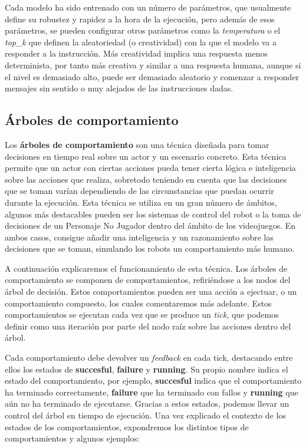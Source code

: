 \documentclass[../main.tex]{subfiles}
\begin{document}
Cada modelo ha sido entrenado con un número de parámetros, que usualmente define su robustez y rapidez a la hora de la ejecución, pero además de esos parámetros, se pueden configurar
otros parámetros como la \textit{temperatura} o el \textit{top\_k} que definen la aleatoriedad (o creatividad) con la que el modelo va a responder a la instrucción. Más creatividad implica
una respuesta menos determinista, por tanto más creativa y similar a una respuesta humana, aunque si el nivel es demasiado alto, puede ser demasiado aleatorio y comenzar a responder mensajes
sin sentido o muy alejados de las instrucciones dadas.

\subsection{Árboles de comportamiento}
Los \textbf{árboles de comportamiento} son una técnica diseñada para tomar decisiones en tiempo real sobre un actor y un escenario concreto. Esta técnica permite que un actor con ciertas
acciones pueda tener cierta lógica e inteligencia sobre las acciones que realiza, sobretodo teniendo en cuenta que las decisiones que se toman varían dependiendo de las circunstancias que puedan
ocurrir durante la ejecución. Esta técnica se utiliza en un gran número de ámbitos, algunos más destacables pueden ser los sistemas de control del robot\cite{ogren2022behavior} o la toma de decisiones de un
Personaje No Jugador dentro del ámbito de los videojuegos. En ambos casos, consigue añadir una inteligencia y un razonamiento sobre las decisiones que se toman, simulando los robots un comportamiento más humano.

A continuación explicaremos el funcionamiento de esta técnica. Los árboles de comportamiento se componen de comportamientos, refiriéndose a los nodos del árbol de decisión. Estos comportamientos pueden ser una acción a ejectuar, o un comportamiento compuesto, los cuales
comentaremos más adelante. Estos comportamientos se ejecutan cada vez que se produce un \textit{tick}, que podemos definir como una iteración por parte del nodo raíz sobre las acciones dentro del árbol. 

Cada comportamiento debe devolver
un \textit{feedback} en cada tick, destacando entre ellos los estados de \textbf{succesful}, \textbf{failure} y \textbf{running}. Su propio nombre indica el estado del comportamiento, por ejemplo, \textbf{succesful} indica que el comportamiento ha terminado correctamente,
\textbf{failure} que ha terminado con fallos y \textbf{running} que aún no ha terminado de ejecutarse. Gracias a estos estados, podemos llevar un control del árbol en tiempo de ejecución. Una vez explicado el contexto de los estados de los comportamientos,
expondremos los distintos tipos de comportamientos y algunos ejemplos:
\end{document}
